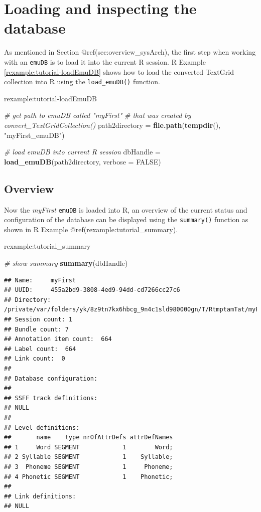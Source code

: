 \documentclass[]{book}
\newenvironment{Shaded}{\begin{snugshade}}{\end{snugshade}}
\newcommand{\CommentTok}[1]{\textcolor[rgb]{0.56,0.35,0.01}{\textit{#1}}}
\newcommand{\DataTypeTok}[1]{\textcolor[rgb]{0.13,0.29,0.53}{#1}}
\newcommand{\KeywordTok}[1]{\textcolor[rgb]{0.13,0.29,0.53}{\textbf{#1}}}
\newcommand{\NormalTok}[1]{#1}
\newcommand{\OtherTok}[1]{\textcolor[rgb]{0.56,0.35,0.01}{#1}}
\newcommand{\StringTok}[1]{\textcolor[rgb]{0.31,0.60,0.02}{#1}}
\theoremstyle{definition}
\theoremstyle{definition}
\theoremstyle{definition}
\theoremstyle{remark}
\begin{document}
\hypertarget{loading-and-inspecting-the-database}{%
\section{Loading and inspecting the
database}\label{loading-and-inspecting-the-database}}

As mentioned in Section @ref(sec:overview\_sysArch), the first step when
working with an \texttt{emuDB} is to load it into the current R session.
R Example \ref{rexample:tutorial-loadEmuDB} shows how to load the
converted TextGrid collection into R using the \texttt{load\_emuDB()}
function.

rexample:tutorial-loadEmuDB

\begin{Shaded}
\begin{Highlighting}[]
\CommentTok{# get path to emuDB called "myFirst"}
\CommentTok{# that was created by convert_TextGridCollection()}
\NormalTok{path2directory =}\StringTok{ }\KeywordTok{file.path}\NormalTok{(}\KeywordTok{tempdir}\NormalTok{(), }\StringTok{"myFirst_emuDB"}\NormalTok{)}

\CommentTok{# load emuDB into current R session}
\NormalTok{dbHandle =}\StringTok{ }\KeywordTok{load_emuDB}\NormalTok{(path2directory, }\DataTypeTok{verbose =} \OtherTok{FALSE}\NormalTok{)}
\end{Highlighting}
\end{Shaded}

\hypertarget{overview}{%
\subsection{Overview}\label{overview}}

Now the \emph{myFirst} \texttt{emuDB} is loaded into R, an overview of
the current status and configuration of the database can be displayed
using the \texttt{summary()} function as shown in R Example
@ref(rexample:tutorial\_summary).

rexample:tutorial\_summary

\begin{Shaded}
\begin{Highlighting}[]
\CommentTok{# show summary}
\KeywordTok{summary}\NormalTok{(dbHandle)}
\end{Highlighting}
\end{Shaded}

\begin{verbatim}
## Name:     myFirst 
## UUID:     455a2bd9-3808-4ed9-94dd-cd7266cc27c6 
## Directory:    /private/var/folders/yk/8z9tn7kx6hbcg_9n4c1sld980000gn/T/RtmptamTat/myFirst_emuDB 
## Session count: 1 
## Bundle count: 7 
## Annotation item count:  664 
## Label count:  664 
## Link count:  0 
## 
## Database configuration:
## 
## SSFF track definitions:
## NULL
## 
## Level definitions:
##       name    type nrOfAttrDefs attrDefNames
## 1     Word SEGMENT            1        Word;
## 2 Syllable SEGMENT            1    Syllable;
## 3  Phoneme SEGMENT            1     Phoneme;
## 4 Phonetic SEGMENT            1    Phonetic;
## 
## Link definitions:
## NULL
\end{verbatim}
\end{document}

